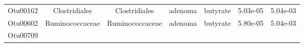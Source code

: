 \documentclass[11pt,]{article}
\begin{document}
\begin{longtable}[]{@{}ccccccc@{}}
\begin{minipage}[t]{0.09\columnwidth}\centering\strut
Otu00162\strut
\end{minipage} & \begin{minipage}[t]{0.17\columnwidth}\centering\strut
Clostridiales\strut
\end{minipage} & \begin{minipage}[t]{0.17\columnwidth}\centering\strut
Clostridiales\strut
\end{minipage} & \begin{minipage}[t]{0.09\columnwidth}\centering\strut
adenoma\strut
\end{minipage} & \begin{minipage}[t]{0.11\columnwidth}\centering\strut
butyrate\strut
\end{minipage} & \begin{minipage}[t]{0.09\columnwidth}\centering\strut
5.03e-05\strut
\end{minipage} & \begin{minipage}[t]{0.09\columnwidth}\centering\strut
5.04e-03\strut
\end{minipage}\tabularnewline
\begin{minipage}[t]{0.09\columnwidth}\centering\strut
Otu00602\strut
\end{minipage} & \begin{minipage}[t]{0.17\columnwidth}\centering\strut
Ruminococcaceae\strut
\end{minipage} & \begin{minipage}[t]{0.17\columnwidth}\centering\strut
Ruminococcaceae\strut
\end{minipage} & \begin{minipage}[t]{0.09\columnwidth}\centering\strut
adenoma\strut
\end{minipage} & \begin{minipage}[t]{0.11\columnwidth}\centering\strut
butyrate\strut
\end{minipage} & \begin{minipage}[t]{0.09\columnwidth}\centering\strut
5.80e-05\strut
\end{minipage} & \begin{minipage}[t]{0.09\columnwidth}\centering\strut
5.04e-03\strut
\end{minipage}\tabularnewline
\begin{minipage}[t]{0.09\columnwidth}\centering\strut
Otu00709\strut
\end{minipage} & \begin{minipage}[t]{0.17\columnwidth}\centering\strut

\end{minipage}
\end{longtable}
\end{document}
